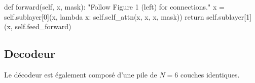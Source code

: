 \documentclass[
  letterpaper,
  DIV=11,
  numbers=noendperiod]{scrreprt}
\newenvironment{Shaded}{\begin{snugshade}}{\end{snugshade}}
\newcommand{\CommentTok}[1]{\textcolor[rgb]{0.37,0.37,0.37}{#1}}
\newcommand{\ControlFlowTok}[1]{\textcolor[rgb]{0.00,0.23,0.31}{#1}}
\newcommand{\DecValTok}[1]{\textcolor[rgb]{0.68,0.00,0.00}{#1}}
\newcommand{\KeywordTok}[1]{\textcolor[rgb]{0.00,0.23,0.31}{#1}}
\newcommand{\NormalTok}[1]{\textcolor[rgb]{0.00,0.23,0.31}{#1}}
\newcommand{\OperatorTok}[1]{\textcolor[rgb]{0.37,0.37,0.37}{#1}}
\newcommand{\VariableTok}[1]{\textcolor[rgb]{0.07,0.07,0.07}{#1}}
\begin{document}
\begin{Shaded}
\begin{Highlighting}[]
    \KeywordTok{def}\NormalTok{ forward(}\VariableTok{self}\NormalTok{, x, mask):}
        \CommentTok{"Follow Figure 1 (left) for connections."}
\NormalTok{        x }\OperatorTok{=} \VariableTok{self}\NormalTok{.sublayer[}\DecValTok{0}\NormalTok{](x, }\KeywordTok{lambda}\NormalTok{ x: }\VariableTok{self}\NormalTok{.self\_attn(x, x, x, mask))}
        \ControlFlowTok{return} \VariableTok{self}\NormalTok{.sublayer[}\DecValTok{1}\NormalTok{](x, }\VariableTok{self}\NormalTok{.feed\_forward)}
      
      
\end{Highlighting}
\end{Shaded}

\subsection{Decodeur}\label{decodeur}

Le décodeur est également composé d'une pile de \(N=6\) couches
identiques.
\end{document}
